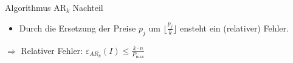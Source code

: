 \begin{frame}{Algorithmus $\text{AR}_k$ Nachteil}	
	\begin{itemize}
		\item 
		Durch die Ersetzung der Preise $p_j$ um $\displaystyle \lfloor \frac {p_j}{k} \rfloor $ ensteht ein (relativer) Fehler.
		
	\end{itemize}
	$\Rightarrow$ Relativer Fehler: $\varepsilon_{AR_k}(I) \le \frac{k \cdot n}{P_{\max}}$
\end{frame}
